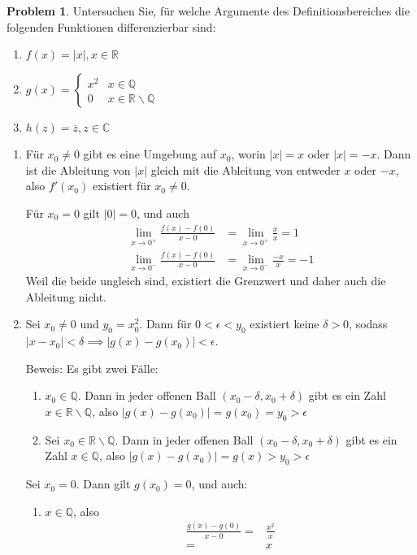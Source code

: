 \documentclass[prb,12pt]{revtex4-2}
\theoremstyle{definition}
\newtheorem{Problem}{Problem}
\theoremstyle{definition}
\newenvironment{parts}{\begin{enumerate}[label=(\alph*)]}{\end{enumerate}}
\newcommand{\R}{\mathbb{R}}
\newcommand{\Q}{\mathbb{Q}}
\newcommand{\C}{\mathbb{C}}
\begin{document}
\begin{Problem}
	Untersuchen Sie, für welche Argumente des Definitionsbereiches die folgenden Funktionen differenzierbar sind:
	\begin{parts}
	\item $f(x)=|x|, x\in \R$ 
	\item $g(x)= \begin{cases}
			x^2 & x\in \Q \\
			0 & x\in \R \backslash \Q
	\end{cases}$ 
\item $h(z)=\overline{z}, z\in \C$
	\end{parts}
\end{Problem}

\begin{parts}
\item F\"{u}r $x_0\neq 0$ gibt es eine Umgebung auf $x_0$, worin $|x|=x$ oder $|x|=-x$. Dann ist die Ableitung von $|x|$ gleich mit die Ableitung von entweder $x$ oder $-x$, also $f'(x_0)$ existiert f\"{u}r $x_0\neq 0$.

	F\"{u}r $x_0=0$ gilt $|0|=0$, und auch
	\begin{align*}
		\lim_{x \to 0^{+}} \frac{f(x)-f(0)}{x-0}&=\lim_{x \to 0^{+}} \frac{x}{x}=1\\
		\lim_{x \to 0^{-}} \frac{f(x)-f(0)}{x-0}&=\lim_{x \to 0^{-}} \frac{-x}{x}=-1
	\end{align*}
	Weil die beide ungleich sind, existiert die Grenzwert und daher auch die Ableitung nicht.

\item Sei $x_0\neq 0$ und $y_0=x_0^2$. Dann f\"{u}r $0<\epsilon<y_0$ existiert keine $\delta>0$, sodass $|x-x_0|<\delta\implies |g(x)-g(x_0)|<\epsilon$.

	Beweis: Es gibt zwei F\"{a}lle:
	\begin{enumerate}[label=(\roman*)]
		\item $x_0\in \Q$. Dann in jeder offenen Ball $(x_0-\delta, x_0+\delta)$ gibt es ein Zahl $x \in \R \backslash \Q$, also $|g(x)-g(x_0)|=g(x_0)=y_0>\epsilon$

		\item Sei $x_0\in \R \backslash \Q$. Dann in jeder offenen Ball $(x_0-\delta, x_0+\delta)$ gibt es ein Zahl $x\in \Q$, also $|g(x)-g(x_0)|=g(x)>y_0>\epsilon$
	\end{enumerate}
	Sei $x_0=0$. Dann gilt $g(x_0)=0$, und auch:
	\begin{enumerate}[label=(\roman*)]
		\item $x\in \Q$, also
			\begin{align*}
				\frac{g(x)-g(0)}{x-0}=& \frac{x^2}{x}\\
				=& x
			\end{align*}


\end{enumerate}
\end{parts}
\end{document}
